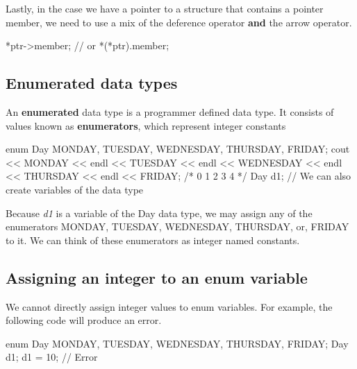 \documentclass{report}
\begin{document}
	\bigbreak \noindent 
	
	\bigbreak \noindent 
	Lastly, in the case we have a pointer to a structure that contains a pointer member, we need to use a mix of the deference operator \textbf{and} the arrow operator. 
	\bigbreak \noindent 
	
	\begin{cppcode}
*ptr->member;
// or
*(*ptr).member;
	\end{cppcode}
	

	\pagebreak
	\subsection{Enumerated data types}
	\bigbreak \noindent 
	\begin{concept}
	   An \textbf{enumerated} data type is a programmer defined data type. It consists of values known as \textbf{enumerators}, which represent integer constants 
	\end{concept}
	\bigbreak \noindent 
	
	\begin{cppcode}
enum Day { MONDAY, TUESDAY, WEDNESDAY, THURSDAY, FRIDAY};
cout << MONDAY << endl 
    << TUESDAY << endl 
    << WEDNESDAY << endl 
    << THURSDAY << endl 
    << FRIDAY;
/*
0
1
2
3
4
*/
Day d1; //	We can also create variables of the data type
	\end{cppcode}
	
	\bigbreak \noindent 
    Because \textit{d1} is a variable of the Day data type, we may assign any of the enumerators MONDAY, TUESDAY, WEDNESDAY, THURSDAY, or, FRIDAY to it.
    \bigbreak \noindent 
    We can think of these enumerators as integer named constants.

    \bigbreak \noindent 
    \subsection{Assigning an integer to an enum variable}
    \bigbreak \noindent 
    We cannot directly assign integer values to enum variables. For example, the following code will produce an error.
    \bigbreak \noindent 
    
    \begin{cppcode}
enum Day { MONDAY, TUESDAY, WEDNESDAY, THURSDAY, FRIDAY};
Day d1;
d1 = 10; // Error
    \end{cppcode}
    
\end{document}
